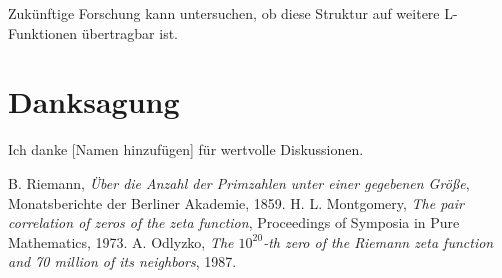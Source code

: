 \documentclass[12pt]{article}
\begin{document}
Zukünftige Forschung kann untersuchen, ob diese Struktur auf weitere L-Funktionen übertragbar ist.

\section*{Danksagung}
Ich danke [Namen hinzufügen] für wertvolle Diskussionen.

\begin{thebibliography}{9}
 B. Riemann, \textit{Über die Anzahl der Primzahlen unter einer gegebenen Größe}, Monatsberichte der Berliner Akademie, 1859.
 H. L. Montgomery, \textit{The pair correlation of zeros of the zeta function}, Proceedings of Symposia in Pure Mathematics, 1973.
 A. Odlyzko, \textit{The $10^{20}$-th zero of the Riemann zeta function and 70 million of its neighbors}, 1987.
\end{thebibliography}
\end{document}
